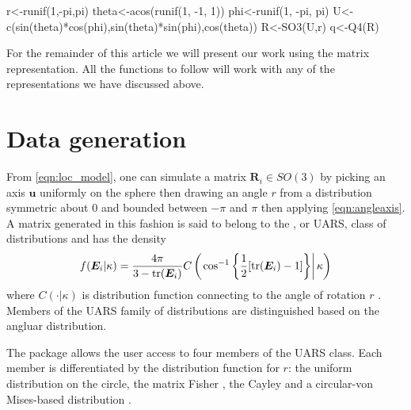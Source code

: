 \begin{example}
r<-runif(1,-pi,pi)
theta<-acos(runif(1, -1, 1))
phi<-runif(1, -pi, pi)
U<-c(sin(theta)*cos(phi),sin(theta)*sin(phi),cos(theta))
R<-SO3(U,r)
q<-Q4(R)
\end{example}


For the remainder of this article we will present our work using the matrix representation.  All the functions to follow will work with any of  the representations we have discussed above.

\section{Data generation} 

From \eqref{eqn:loc_model}, one can simulate a matrix $\bm{R}_i\in SO(3)$ by picking an axis $\bm u$ uniformly on the sphere then drawing an angle $r$ from a distribution symmetric about $0$ and bounded between $-\pi$ and $\pi$ then applying \eqref{eqn:angleaxis}.  A matrix generated in this fashion is said to belong to the , or UARS, class of distributions and has the density
\begin{equation}\label{eq:uarsden}
f(\bm E_i|\kappa)=\frac{4\pi}{3-\text{tr}(\bm E_i)}C\left(\left.\cos^{-1}\left\{\frac{1}{2}[\text{tr}(\bm E_i)-1]\right\}\right|\kappa\right)
\end{equation}
where $C(\cdot|\kappa)$ is distribution function connecting to the angle of rotation $r$ \citep{bingham2009}.  Members of the UARS family of distributions are distinguished based on the angluar distribution.


The  package allows the user access to four members of the UARS class.  Each member is differentiated by the distribution function for $r$: the uniform distribution on the circle, the matrix Fisher \citep{langevin2005, downs1972, khatri1977, jupp1979}, the Cayley  \citep{Schaeben1997, leon2006} and a circular-von Mises-based distribution \citep{bingham2009}. 

